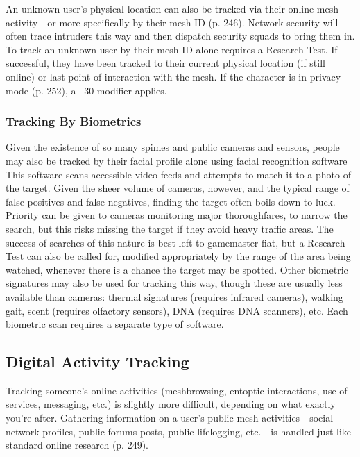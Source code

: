 An unknown user's physical location can also be 
tracked via their online mesh activity—or more specifically
by their mesh ID (p. 246). Network security
will often trace intruders this way and then dispatch 
security squads to bring them in. To track an unknown 
user by their mesh ID alone requires a Research Test. 
If successful, they have been tracked to their current 
physical location (if still online) or last point of interaction
with the mesh. If the character is in privacy
mode (p. 252), a –30 modifier applies.

\subsubsection{Tracking By Biometrics}

Given the existence of so many spimes and public 
cameras and sensors, people may also be tracked by 
their facial profile alone using facial recognition software
This software scans accessible video feeds and
attempts to match it to a photo of the target. Given 
the sheer volume of cameras, however, and the typical 
range of false-positives and false-negatives, finding 
the target often boils down to luck. Priority can be 
given to cameras monitoring major thoroughfares, to 
narrow the search, but this risks missing the target if 
they avoid heavy traffic areas. The success of searches 
of this nature is best left to gamemaster fiat, but a 
Research Test can also be called for, modified appropriately
by the range of the area being watched,
whenever there is a chance the target may be spotted.
Other biometric signatures may also be used for 
tracking this way, though these are usually less available
than cameras: thermal signatures (requires infrared
cameras), walking gait, scent (requires olfactory
sensors), DNA (requires DNA scanners), etc. Each 
biometric scan requires a separate type of software.

\subsection{Digital Activity Tracking}

Tracking someone's online activities (meshbrowsing, 
entoptic interactions, use of services, messaging, etc.) 
is slightly more difficult, depending on what exactly 
you're after. Gathering information on a user's public 
mesh activities—social network profiles, public 
forums posts, public lifelogging, etc.—is handled just 
like standard online research (p. 249).

